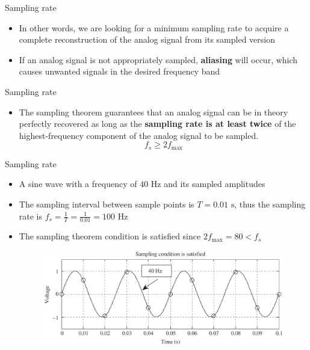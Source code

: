 \documentclass[pdflatex,compress,mathserif]{beamer}
\begin{document}
\begin{frame}{Sampling rate}
    \begin{itemize}
        \item In other words, we are looking for a minimum sampling rate to acquire a complete reconstruction of the analog signal from its sampled version
        \item If an analog signal is not appropriately sampled, \textbf{aliasing} will occur, which causes unwanted signals in the desired frequency band
    \end{itemize}    
\end{frame}

\begin{frame}{Sampling rate}
    \begin{itemize}
        \item The sampling theorem guarantees that an analog signal can be in theory perfectly recovered as long as the \textbf{sampling rate is at least twice} of the highest-frequency component of the analog signal to be sampled.
        $$f_s \geq 2 f_\text{max}$$ 
    \end{itemize}    
\end{frame}

\begin{frame}{Sampling rate}
    \begin{itemize}
        \item A sine wave with a frequency of 40 Hz and its sampled amplitudes
        \item The sampling interval between sample points is $T = 0.01 \text{ s}$, thus the sampling rate is $f_s = \frac{1}{T} = \frac{1}{0.01} = 100 \text{ Hz}$
        \item The sampling theorem condition is satisfied since $2f_\text{max} =  80 < f_s$
        \begin{figure}
            \includegraphics[width=0.9\linewidth]{./img/img04.png}
        \end{figure}
    \end{itemize}
\end{frame}
\end{document}
